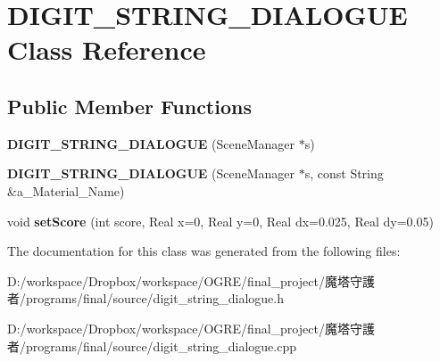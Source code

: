 \hypertarget{class_d_i_g_i_t___s_t_r_i_n_g___d_i_a_l_o_g_u_e}{
\section{DIGIT\_\-STRING\_\-DIALOGUE Class Reference}
\label{class_d_i_g_i_t___s_t_r_i_n_g___d_i_a_l_o_g_u_e}
}
\subsection*{Public Member Functions}
\begin{DoxyCompactItemize}
\item 
\hypertarget{class_d_i_g_i_t___s_t_r_i_n_g___d_i_a_l_o_g_u_e_a2e3cd1084b5603e08ace7d33bf080543}{
{\bfseries DIGIT\_\-STRING\_\-DIALOGUE} (SceneManager $\ast$s)}
\label{class_d_i_g_i_t___s_t_r_i_n_g___d_i_a_l_o_g_u_e_a2e3cd1084b5603e08ace7d33bf080543}

\item 
\hypertarget{class_d_i_g_i_t___s_t_r_i_n_g___d_i_a_l_o_g_u_e_a45c838d2a43188f1b1f84fdd2d8cf469}{
{\bfseries DIGIT\_\-STRING\_\-DIALOGUE} (SceneManager $\ast$s, const String \&a\_\-Material\_\-Name)}
\label{class_d_i_g_i_t___s_t_r_i_n_g___d_i_a_l_o_g_u_e_a45c838d2a43188f1b1f84fdd2d8cf469}

\item 
\hypertarget{class_d_i_g_i_t___s_t_r_i_n_g___d_i_a_l_o_g_u_e_aa5b96dc29e9bd124322ec4c19d4f1ec6}{
void {\bfseries setScore} (int score, Real x=0, Real y=0, Real dx=0.025, Real dy=0.05)}
\label{class_d_i_g_i_t___s_t_r_i_n_g___d_i_a_l_o_g_u_e_aa5b96dc29e9bd124322ec4c19d4f1ec6}

\end{DoxyCompactItemize}


The documentation for this class was generated from the following files:\begin{DoxyCompactItemize}
\item 
D:/workspace/Dropbox/workspace/OGRE/final\_\-project/魔塔守護者/programs/final/source/digit\_\-string\_\-dialogue.h\item 
D:/workspace/Dropbox/workspace/OGRE/final\_\-project/魔塔守護者/programs/final/source/digit\_\-string\_\-dialogue.cpp\end{DoxyCompactItemize}
